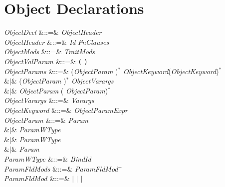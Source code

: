 \section{Object Declarations}

\begin{Grammar}
\emph{ObjectDecl}  &::=& 
\emph{ObjectHeader}  
 \\

\emph{ObjectHeader} &::=&  \emph{Id}
 
 \emph{FnClauses} \\

\emph{ObjectMods} &::=& \emph{TraitMods}\\

\emph{ObjectValParam} &::=& \texttt(  \texttt) \\

\emph{ObjectParams}
&::=&
(\emph{ObjectParam} \EXP{,})$^*$ 
      \emph{ObjectKeyword}(\EXP{,}\emph{ObjectKeyword})$^*$\\
&$|$&
(\emph{ObjectParam} \EXP{,})$^*$ \emph{ObjectVarargs}\\
&$|$& \emph{ObjectParam} (\EXP{,} \emph{ObjectParam})$^*$\\

\emph{ObjectVarargs} &::=&  \emph{Varargs}\\

\emph{ObjectKeyword} &::=& \emph{ObjectParam}\EXP{=}\emph{Expr}\\

\emph{ObjectParam} &::=&
 \emph{Param} \\
&$|$&   \emph{ParamWType} \\
&$|$&   \emph{ParamWType} \\
&$|$&  \emph{Param} \\

\emph{ParamWType} &::=& \emph{BindId}  \\

\emph{ParamFldMods} &::=& \emph{ParamFldMod}$^+$\\

\emph{ParamFldMod} &::=& $|$  $|$  $|$ \\


\end{Grammar}
